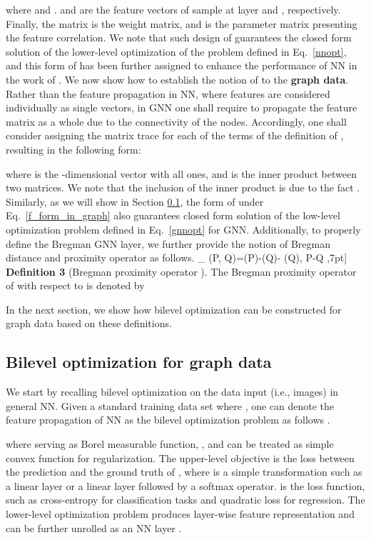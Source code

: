 \documentclass{article}
\begin{document}
where  and .  and  are the feature vectors of sample  at layer  and , respectively. Finally, the matrix  is the weight matrix, and  is the parameter matrix presenting the feature correlation. We note that such design of  guarantees the closed form solution of the lower-level optimization of the problem defined in Eq.~\eqref{nnopt}, and this form of  has been further assigned to enhance the performance of NN in the work of \cite{frecon2022bregman}. We now show how to establish the notion of  to the \textbf{graph data}. Rather than the feature propagation in NN, where features are considered individually as single vectors, in GNN one shall require to propagate the feature matrix as a whole due to the connectivity of the nodes. Accordingly, one shall consider assigning the matrix trace for each of the terms of the definition of , resulting in the following form: 

where  is the -dimensional vector with all ones, and  is the inner product between two matrices. We note that the inclusion of the inner product is due to the fact .  Similarly, as we will show in Section \ref{SubSec:2.2}, the form of  under Eq.~\eqref{f_form_in_graph} also guarantees closed form solution of the low-level optimization problem defined in Eq.~\eqref{gnnopt} for GNN. Additionally, to properly define the Bregman GNN layer, we further provide the notion of Bregman distance and proximity operator as follows.
\D_{\phi} (\mathbf P, \mathbf Q)=\phi(\mathbf P)-\phi(\mathbf Q)- \langle \nabla \phi (\mathbf Q), \mathbf P-\mathbf Q \rangle,7pt]
\textbf{Definition 3} (Bregman proximity operator \cite{van2017forward}).
The Bregman proximity operator of  with respect to  is denoted by

In the next section, we show how bilevel optimization can be constructed for graph data based on these definitions.


\subsection{Bilevel optimization for graph data}\label{SubSec:2.2}

We start by recalling bilevel optimization on the data input (i.e., images) in general NN. Given a standard training data set  where , one
can denote the feature propagation of NN as the bilevel optimization problem as follows \cite{frecon2022bregman}.

where  serving as Borel measurable function, , and  can be treated as simple convex function for regularization. 
The upper-level objective is the loss between the prediction  and the ground truth of , where  is a simple transformation such as a linear layer or a linear layer followed by a softmax operator.  is the loss function, such as cross-entropy for classification tasks and quadratic loss for regression. The lower-level optimization problem produces layer-wise feature representation and can be further unrolled as an NN layer \cite{frecon2022bregman}.
\end{document}
